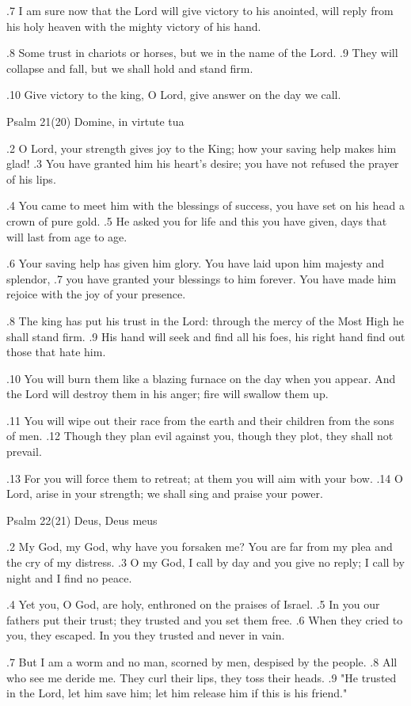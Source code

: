 .7 I am sure now that the Lord
will give victory to his anointed,
will reply from his holy heaven
with the mighty victory of his hand.

.8 Some trust in chariots or horses,
but we in the name of the Lord.
.9 They will collapse and fall,
but we shall hold and stand firm.

.10 Give victory to the king, O Lord,
give answer on the day we call.


Psalm 21(20) Domine, in virtute tua

.2 O Lord, your strength gives joy to the King;
how your saving help makes him glad!
.3 You have granted him his heart's desire;
you have not refused the prayer of his lips.

.4 You came to meet him with the blessings of success,
you have set on his head a crown of pure gold.
.5 He asked you for life and this you have given,
days that will last from age to age.

.6 Your saving help has given him glory.
You have laid upon him majesty and splendor,
.7 you have granted your blessings to him forever.
You have made him rejoice with the joy of your presence.

.8 The king has put his trust in the Lord:
through the mercy of the Most High he shall stand firm.
.9 His hand will seek and find all his foes,
his right hand find out those that hate him.

.10 You will burn them like a blazing furnace
on the day when you appear.
And the Lord will destroy them in his anger;
fire will swallow them up.

.11 You will wipe out their race from the earth
and their children from the sons of men.
.12 Though they plan evil against you,
though they plot, they shall not prevail.

.13 For you will force them to retreat;
at them you will aim with your bow.
.14 O Lord, arise in your strength;
we shall sing and praise your power.


Psalm 22(21) Deus, Deus meus

.2 My God, my God, why have you forsaken me?
You are far from my plea and the cry of my distress.
.3 O my God, I call by day and you give no reply;
I call by night and I find no peace.

.4 Yet you, O God, are holy,
enthroned on the praises of Israel.
.5 In you our fathers put their trust;
they trusted and you set them free.
.6 When they cried to you, they escaped.
In you they trusted and never in vain.

.7 But I am a worm and no man,
scorned by men, despised by the people.
.8 All who see me deride me.
They curl their lips, they toss their heads.
.9 "He trusted in the Lord, let him save him;
let him release him if this is his friend."

